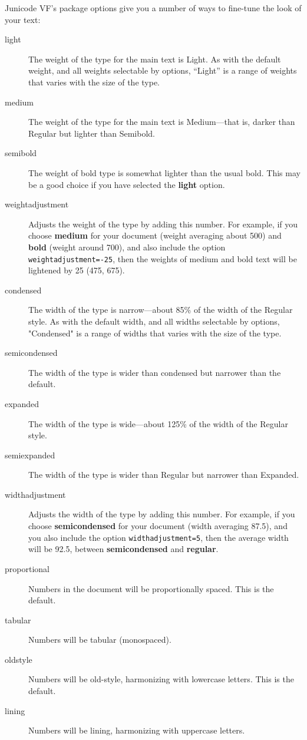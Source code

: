 \documentclass[12pt]{article}
\begin{document}
Junicode VF's package options give you a number of ways to fine-tune the look of
your text:

\begin{description}
    \item[light] The weight of the type for the main text is Light. As with the default
    weight, and all weights selectable by options, “Light” is a range of weights that varies
    with the size of the type.
    \item[medium] The weight of the type for the main text is Medium---that is, darker than
    Regular but lighter than Semibold.
    \item[semibold] The weight of bold type is somewhat lighter than the usual bold. This may be a
    good choice if you have selected the \textbf{light} option.
    \item[weightadjustment] Adjusts the weight of the type by adding this number.
    For example, if you choose \textbf{medium} for your document (weight averaging about 500)
    and \textbf{bold} (weight around 700), and also include the option {\verb|weightadjustment=-25|},
    then the weights of medium and bold text will be lightened by 25 (475, 675).
    \item[condensed] The width of the type is narrow---about 85\% of the width of the Regular style.
    As with the default
    width, and all widths selectable by options, "Condensed" is a range of widths that varies
    with the size of the type.
    \item[semicondensed] The width of the type is wider than condensed but narrower than the default.
    \item[expanded] The width of the type is wide---about 125\% of the width of the Regular style.
    \item[semiexpanded] The width of the type is wider than Regular but narrower than Expanded.
    \item[widthadjustment] Adjusts the width of the type by adding this number. For example, if you
    choose \textbf{semicondensed} for your document (width averaging 87.5), and you also include
    the option {\verb|widthadjustment=5|}, then the average width will be 92.5, between
    \textbf{semicondensed} and \textbf{regular}.
    \item[proportional] Numbers in the document will be proportionally spaced. This is the default.
    \item[tabular] Numbers will be tabular (monospaced).
    \item[oldstyle] Numbers will be old-style, harmonizing with lowercase letters. This is the default.
    \item[lining] Numbers will be lining, harmonizing with uppercase letters.
\end{description}
\end{document}
